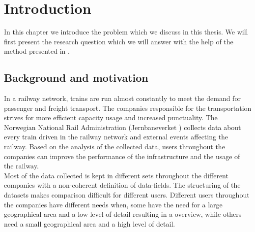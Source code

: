 
\chapter{Introduction}
\label{chapter:introduction}


In this chapter we introduce the problem which we discuss in this thesis.
We will first present the research question which we will answer with the help
of the method presented in  .

\section{Background and motivation} %
\label{sec:background_and_motivation}
In a railway network, trains are run almost constantly to meet the demand for 
passenger and freight transport. The companies responsible for the 
transportation strives for more efficient capacity usage and increased 
punctuality. The Norwegian National Rail Administration (Jernbaneverket 
\cite{jernbaneverketAbout}) collects data about every train driven in the 
railway network and external events affecting the railway. 
Based on the analysis of the collected data, users throughout the companies 
can improve the performance of the infrastructure and the usage of the 
railway.\\

Most of the data collected is kept in different sets throughout the different
companies with a non-coherent definition of data-fields. The structuring of 
the datasets makes comparison difficult for different users. Different users
throughout the companies have different needs when, some have
the need for a large geographical area and a low level of detail resulting in a
overview, while others need a small geographical area and a high level of 
detail. \\


